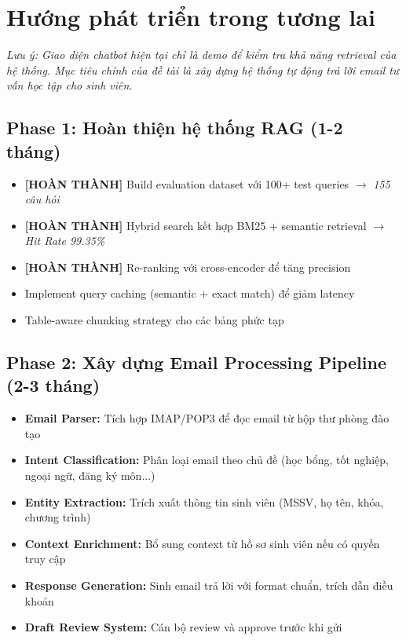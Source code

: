 \documentclass[../DoAn.tex]{subfiles}
\begin{document}
\section{Hướng phát triển trong tương lai}

\textit{Lưu ý: Giao diện chatbot hiện tại chỉ là demo để kiểm tra khả năng retrieval của hệ thống. Mục tiêu chính của đề tài là xây dựng hệ thống tự động trả lời email tư vấn học tập cho sinh viên.}

\subsection{Phase 1: Hoàn thiện hệ thống RAG (1-2 tháng)}
\begin{itemize}
    \item \textbf{[HOÀN THÀNH]} Build evaluation dataset với 100+ test queries $\rightarrow$ \textit{155 câu hỏi}
    \item \textbf{[HOÀN THÀNH]} Hybrid search kết hợp BM25 + semantic retrieval $\rightarrow$ \textit{Hit Rate 99.35\%}
    \item \textbf{[HOÀN THÀNH]} Re-ranking với cross-encoder để tăng precision
    \item Implement query caching (semantic + exact match) để giảm latency
    \item Table-aware chunking strategy cho các bảng phức tạp
\end{itemize}

\subsection{Phase 2: Xây dựng Email Processing Pipeline (2-3 tháng)}
\begin{itemize}
    \item \textbf{Email Parser:} Tích hợp IMAP/POP3 để đọc email từ hộp thư phòng đào tạo
    \item \textbf{Intent Classification:} Phân loại email theo chủ đề (học bổng, tốt nghiệp, ngoại ngữ, đăng ký môn...)
    \item \textbf{Entity Extraction:} Trích xuất thông tin sinh viên (MSSV, họ tên, khóa, chương trình)
    \item \textbf{Context Enrichment:} Bổ sung context từ hồ sơ sinh viên nếu có quyền truy cập
    \item \textbf{Response Generation:} Sinh email trả lời với format chuẩn, trích dẫn điều khoản
    \item \textbf{Draft Review System:} Cán bộ review và approve trước khi gửi
\end{itemize}
\end{document}
